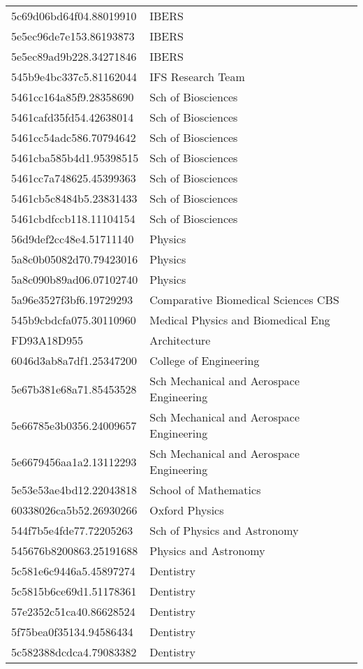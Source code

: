 \begin{tabular}{ll}
5c69d06bd64f04.88019910 & IBERS \\
5e5ec96de7e153.86193873 & IBERS \\
5e5ec89ad9b228.34271846 & IBERS \\
545b9e4bc337c5.81162044 & IFS Research Team \\
5461cc164a85f9.28358690 & Sch of Biosciences \\
5461cafd35fd54.42638014 & Sch of Biosciences \\
5461cc54adc586.70794642 & Sch of Biosciences \\
5461cba585b4d1.95398515 & Sch of Biosciences \\
5461cc7a748625.45399363 & Sch of Biosciences \\
5461cb5c8484b5.23831433 & Sch of Biosciences \\
5461cbdfccb118.11104154 & Sch of Biosciences \\
56d9def2cc48e4.51711140 & Physics \\
5a8c0b05082d70.79423016 & Physics \\
5a8c090b89ad06.07102740 & Physics \\
5a96e3527f3bf6.19729293 & Comparative Biomedical Sciences CBS \\
545b9cbdcfa075.30110960 & Medical Physics and Biomedical Eng \\
FD93A18D955 & Architecture \\
6046d3ab8a7df1.25347200 & College of Engineering \\
5e67b381e68a71.85453528 & Sch Mechanical and Aerospace Engineering \\
5e66785e3b0356.24009657 & Sch Mechanical and Aerospace Engineering \\
5e6679456aa1a2.13112293 & Sch Mechanical and Aerospace Engineering \\
5e53e53ae4bd12.22043818 & School of Mathematics \\
60338026ca5b52.26930266 & Oxford Physics \\
544f7b5e4fde77.72205263 & Sch of Physics and Astronomy \\
545676b8200863.25191688 & Physics and Astronomy \\
5c581e6c9446a5.45897274 & Dentistry \\
5c5815b6ce69d1.51178361 & Dentistry \\
57e2352c51ca40.86628524 & Dentistry \\
5f75bea0f35134.94586434 & Dentistry \\
5c582388dcdca4.79083382 & Dentistry \\

\end{tabular}
